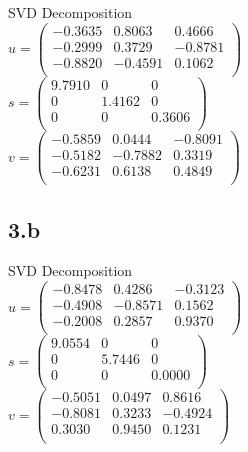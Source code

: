 \documentclass{article}
\begin{document}
SVD Decomposition\\
$u =
\begin{pmatrix}
   -0.3635 &   0.8063 &   0.4666 \\
   -0.2999 &   0.3729 &  -0.8781\\
   -0.8820 &  -0.4591 &   0.1062\\
\end{pmatrix}$\\

$s =
\begin{pmatrix}
    9.7910   &      0      &   0\\
         0  &  1.4162      &   0\\
         0   &      0  &  0.3606\\
\end{pmatrix}$\\

$v =
\begin{pmatrix}
   -0.5859 &   0.0444  & -0.8091 \\
   -0.5182 &  -0.7882  &  0.3319 \\
   -0.6231 &   0.6138  &  0.4849 \\
\end{pmatrix}$
\subsection*{3.b}
SVD Decomposition\\
$u =
\begin{pmatrix}
   -0.8478  &  0.4286  & -0.3123 \\
   -0.4908  & -0.8571  &  0.1562 \\
   -0.2008 &   0.2857  &  0.9370 \\
\end{pmatrix}$\\

$s =
\begin{pmatrix}
    9.0554     &    0    &     0\\
         0   & 5.7446    &     0\\
         0   &      0   & 0.0000\\
\end{pmatrix}$\\

$v =
\begin{pmatrix}
   -0.5051  &  0.0497  &  0.8616\\
   -0.8081  &  0.3233  & -0.4924\\
    0.3030  &  0.9450  &  0.1231\\
\end{pmatrix}$
\end{document}

